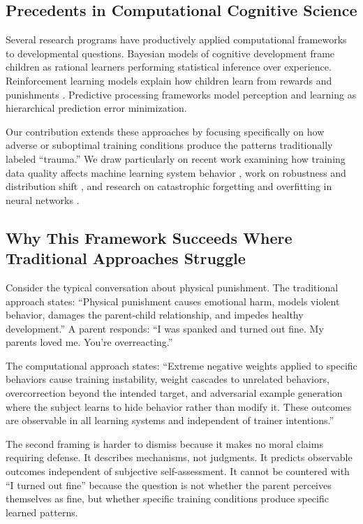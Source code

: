 \documentclass{article}
\begin{document}
\subsection{Precedents in Computational Cognitive Science}

Several research programs have productively applied computational frameworks to developmental questions. Bayesian models of cognitive development \cite{gopnik2012} frame children as rational learners performing statistical inference over experience. Reinforcement learning models explain how children learn from rewards and punishments \cite{niv2016}. Predictive processing frameworks \cite{clark2013} model perception and learning as hierarchical prediction error minimization.

Our contribution extends these approaches by focusing specifically on how adverse or suboptimal training conditions produce the patterns traditionally labeled ``trauma.'' We draw particularly on recent work examining how training data quality affects machine learning system behavior \cite{northcutt2021}, work on robustness and distribution shift \cite{hendrycks2019}, and research on catastrophic forgetting and overfitting in neural networks \cite{goodfellow2016}.

\subsection{Why This Framework Succeeds Where Traditional Approaches Struggle}

Consider the typical conversation about physical punishment. The traditional approach states: ``Physical punishment causes emotional harm, models violent behavior, damages the parent-child relationship, and impedes healthy development.'' A parent responds: ``I was spanked and turned out fine. My parents loved me. You're overreacting.''

The computational approach states: ``Extreme negative weights applied to specific behaviors cause training instability, weight cascades to unrelated behaviors, overcorrection beyond the intended target, and adversarial example generation where the subject learns to hide behavior rather than modify it. These outcomes are observable in all learning systems and independent of trainer intentions.''

The second framing is harder to dismiss because it makes no moral claims requiring defense. It describes mechanisms, not judgments. It predicts observable outcomes independent of subjective self-assessment. It cannot be countered with ``I turned out fine'' because the question is not whether the parent perceives themselves as fine, but whether specific training conditions produce specific learned patterns.
\end{document}
